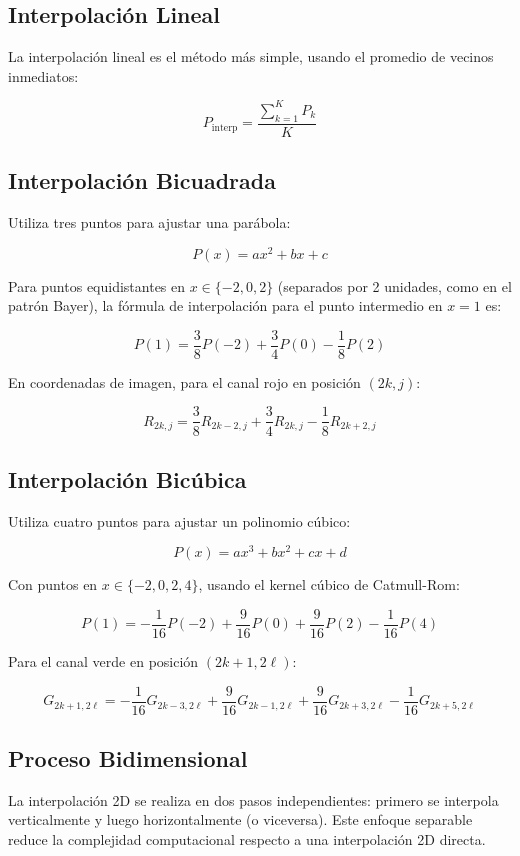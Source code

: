 \subsection{Interpolación Lineal}
La interpolación lineal es el método más simple, usando el promedio de vecinos inmediatos:

\[
P_{\text{interp}} = \frac{\sum^{K}_{k=1} P_k}{K}
\]



\subsection{Interpolación Bicuadrada}
Utiliza tres puntos para ajustar una parábola:

\[
P(x) = ax^2 + bx + c
\]

Para puntos equidistantes en $x \in \{-2, 0, 2\}$ (separados por 2 unidades, como en el patrón Bayer), la fórmula de interpolación para el punto intermedio en $x=1$ es:

\[
P(1) = \frac{3}{8}P(-2) + \frac{3}{4}P(0) - \frac{1}{8}P(2)
\]

En coordenadas de imagen, para el canal rojo en posición $(2k,j)$:

\[
R_{2k,j} = \frac{3}{8}R_{2k-2,j} + \frac{3}{4}R_{2k,j} - \frac{1}{8}R_{2k+2,j}
\]




\subsection{Interpolación Bicúbica}
Utiliza cuatro puntos para ajustar un polinomio cúbico:

\[
P(x) = ax^3 + bx^2 + cx + d
\]

Con puntos en $x \in \{-2, 0, 2, 4\}$, usando el kernel cúbico de Catmull-Rom:

\[
P(1) = -\frac{1}{16}P(-2) + \frac{9}{16}P(0) + \frac{9}{16}P(2) - \frac{1}{16}P(4)
\]

Para el canal verde en posición $(2k+1,2\ell)$:

\[
G_{2k+1,2\ell} = -\frac{1}{16}G_{2k-3,2\ell} + \frac{9}{16}G_{2k-1,2\ell} + \frac{9}{16}G_{2k+3,2\ell} - \frac{1}{16}G_{2k+5,2\ell}
\]



\subsection{Proceso Bidimensional}
La interpolación 2D se realiza en dos pasos independientes: primero se interpola verticalmente y luego horizontalmente (o viceversa). Este enfoque separable reduce la complejidad computacional respecto a una interpolación 2D directa.